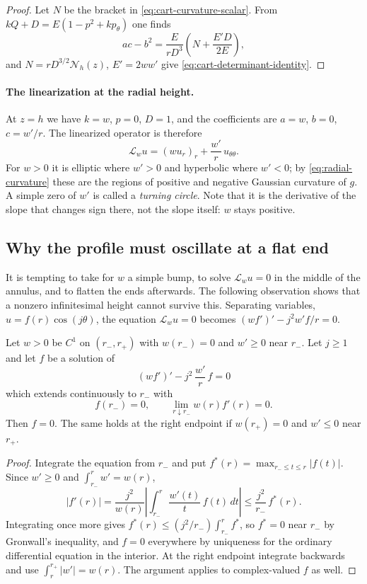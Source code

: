 \begin{proof}
Let $N$ be the bracket in \eqref{eq:cart-curvature-scalar}. From
$kQ+D=E(1-p^2+kp_\theta)$ one finds
\[
 ac-b^2=\frac E{rD^3}\left(N+\frac{E'D}{2E}\right),
\]
and $N=rD^{3/2}\mathcal N_h(z)$, $E'=2ww'$ give
\eqref{eq:cart-determinant-identity}.
\end{proof}

\paragraph{The linearization at the radial height.}
At $z=h$ we have $k=w$, $p=0$, $D=1$, and the coefficients are $a=w$,
$b=0$, $c=w'/r$. The linearized operator is therefore
\begin{equation}\label{eq:intro-linearization}
 \mathscr L_wu=(wu_r)_r+\frac{w'}r\,u_{\theta\theta}.
\end{equation}
For $w>0$ it is elliptic where $w'>0$ and hyperbolic where $w'<0$; by
\eqref{eq:radial-curvature} these are the regions of positive and
negative Gaussian curvature of $g$. A simple zero of $w'$ is called a
\emph{turning circle}. Note that it is the derivative of the slope
that changes sign there, not the slope itself: $w$ stays positive.

\subsection{Why the profile must oscillate at a flat end}
\label{subsec:monotone}

It is tempting to take for $w$ a simple bump, to solve
$\mathscr L_wu=0$ in the middle of the annulus, and to flatten the
ends afterwards. The following observation shows that a nonzero
infinitesimal height cannot survive this. Separating variables,
$u=f(r)\cos(j\theta)$, the equation $\mathscr L_wu=0$ becomes
$(wf')'-j^2w'f/r=0$.

\begin{proposition}
\label{prop:obs-monotone-tail}
Let $w>0$ be $C^1$ on $(r_-,r_+)$ with $w(r_-)=0$ and $w'\ge0$ near
$r_-$. Let $j\ge1$ and let $f$ be a solution of
\[
 (wf')'-j^2\,\frac{w'}{r}\,f=0
\]
which extends continuously to $r_-$ with
\[
 f(r_-)=0,\qquad \lim_{r\downarrow r_-}w(r)f'(r)=0 .
\]
Then $f=0$. The same holds at the right endpoint if $w(r_+)=0$ and
$w'\le0$ near $r_+$.
\end{proposition}

\begin{proof}
Integrate the equation from $r_-$ and put
$f^*(r)=\max_{r_-\le t\le r}|f(t)|$. Since $w'\ge0$ and
$\int_{r_-}^rw'=w(r)$,
\[
 |f'(r)|=\frac{j^2}{w(r)}
       \left|\int_{r_-}^r\frac{w'(t)}t\,f(t)\,dt\right|
 \le\frac{j^2}{r_-}\,f^*(r).
\]
Integrating once more gives
$f^*(r)\le(j^2/r_-)\int_{r_-}^rf^*$, so $f^*=0$ near $r_-$ by
Gronwall's inequality, and $f=0$ everywhere by uniqueness for the
ordinary differential equation in the interior. At the right endpoint
integrate backwards and use $\int_r^{r_+}|w'|=w(r)$. The argument
applies to complex-valued $f$ as well.
\end{proof}

